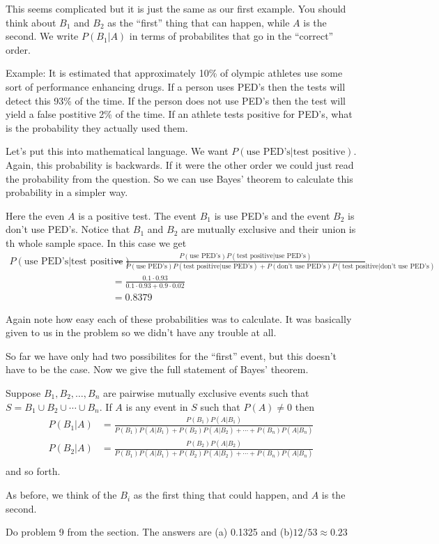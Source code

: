 \documentclass[14,fleqn]{article}
\begin{document}
This seems complicated but it is just the same as our first example. You should think about $B_1$ and $B_2$ as the ``first'' thing that can happen, while $A$ is the second. We write $P(B_1|A)$ in terms of probabilites that go in the ``correct'' order.

Example: It is estimated that approximately 10\% of olympic athletes use some sort of performance enhancing drugs. If a person uses PED's then the tests will detect this 93\% of the time. If the person does not use PED's then the test will yield a false postitive 2\% of the time. If an athlete tests positive for PED's, what is the probability they actually used them.

Let's put this into mathematical language. We want $P(\text{use PED's}|\text{test positive}).$ Again, this probability is backwards. If it were the other order we could just read the probability from the question. So we can use Bayes' theorem to calculate this probability in a simpler way.

Here the even $A$ is a positive test. The event $B_1$ is use PED's and the event $B_2$ is don't use PED's. Notice that $B_1$ and $B_2$ are mutually exclusive and their union is th whole sample space. In this case we get
\begin{align*}
	P(\text{use PED's}|\text{test positive})&=\frac{P(\text{use PED's})P(\text{test positive}|\text{use PED's})}{P(\text{use PED's})P(\text{test positive}|\text{use PED's})+P(\text{don't use PED's})P(\text{test positive}|\text{don't use PED's})}\\
						&=\frac{0.1\cdot 0.93}{0.1\cdot 0.93+0.9\cdot 0.02}\\
						&=0.8379
\end{align*}

Again note how easy each of these probabilities was to calculate. It was basically given to us in the problem so we didn't have any trouble at all. 

So far we have only had two possibilites for the ``first'' event, but this doesn't have to be the case. Now we give the full statement of Bayes' theorem.

Suppose $B_1,B_2,\dots,B_n$ are pairwise mutually exclusive events such that $S=B_1\cup B_2\cup \cdots \cup B_n.$ If $A$ is any event in $S$ such that $P(A)\neq 0$ then
\begin{align*}
	P(B_1|A)&=\frac{P(B_1)P(A|B_1)}{P(B_1)P(A|B_1)+P(B_2)P(A|B_2)+\cdots + P(B_n)P(A|B_n)}\\
	P(B_2|A)&=\frac{P(B_2)P(A|B_2)}{P(B_1)P(A|B_1)+P(B_2)P(A|B_2)+\cdots + P(B_n)P(A|B_n)}\\
\end{align*}
and so forth. 

As before, we think of the $B_i$ as the first thing that could happen, and $A$ is the second. 

Do problem 9 from the section. The answers are (a) 0.1325 and (b)$12/53\approx 0.23$
\end{document}
